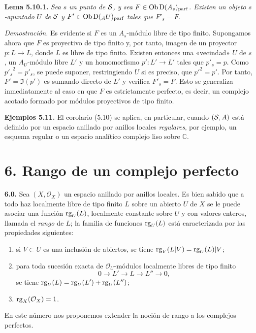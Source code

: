 \textbf{Lema 5.10.1.} \emph{Sea \(s\) un punto de \(\sisi{S}{\mathcal S}\), y sea \(F\in\Ob\Dpx(A_s)_{\mathrm{parf}}\). Existen un objeto \(s\)-apuntado \(U\) de \(\sisi{S}{\mathcal S}\) y \(F'\in\Ob\Dpx({}_A U)_{\mathrm{parf}}\) tales que \(F'_s=F\).}

\emph{Demostración.} Es evidente si \(F\) es un \(A_s\)-módulo libre de tipo finito. Supongamos ahora que \(F\) es proyectivo de tipo finito y, por tanto, imagen de un proyector \(p:L\longrightarrow L\), donde \(L\) es libre de tipo finito. Existen entonces una «vecindad» \(U\) de \(s\), un \(A_U\)-módulo libre \(L'\) y un homomorfismo \(p':L'\to L'\) tales que \(p'_s=p\). Como \({p'_s}^2=p'_s\), se puede suponer, restringiendo \(U\) si es preciso, que \(p'^2=p'\). Por tanto, \(F'=\Im(p')\) es sumando directo de \(L'\) y verifica \(F'_s=F\). Esto se generaliza inmediatamente al caso en que \(F\) es estrictamente perfecto, es decir, un complejo acotado formado por módulos proyectivos de tipo finito.

\textbf{Ejemplos 5.11.} El corolario (5.10) se aplica, en particular, cuando \((\sisi{S}{\mathcal S},A)\) está definido por un espacio anillado por anillos locales \emph{regulares}, por ejemplo, un esquema regular o un espacio analítico complejo liso sobre \(\mathbb C\).

\section*{6. Rango de un complejo perfecto}

\textbf{6.0.} Sea \((X,\mathcal O_X)\) un espacio anillado por anillos locales. Es bien sabido que a todo haz localmente libre de tipo finito \(L\) sobre un abierto \(U\) de \(X\) se le puede asociar una función \(\rg_U(L)\), localmente constante sobre \(U\) y con valores enteros, llamada el \emph{rango} de \(L\); la familia de funciones \(\rg_U(L)\) está caracterizada por las propiedades siguientes:
\begin{enumerate}[label=(\roman*)]
\item si \(V\subset U\) es una inclusión de abiertos, se tiene \(\rg_V(L|V)=\rg_U(L)|V\);
\item para toda sucesión exacta de \(\mathcal O_U\)-módulos localmente libres de tipo finito
\[
  0\longrightarrow L'\longrightarrow L\longrightarrow L''\longrightarrow 0,
\]
se tiene \(\rg_U(L)=\rg_U(L')+\rg_U(L'')\);
\item \(\rg_X(\mathcal O_X)=1\).
\end{enumerate}
En este número nos proponemos extender la noción de rango a los complejos perfectos.

